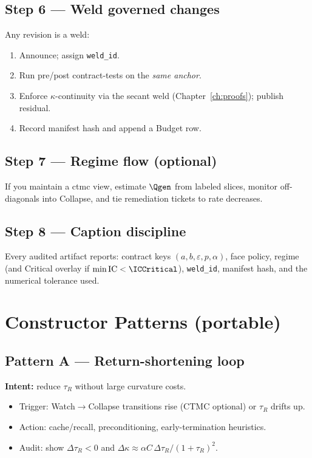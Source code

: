 \subsection*{Step 6 — Weld governed changes}
Any revision is a weld:
\begin{enumerate}[leftmargin=1.25em]
  \item Announce; assign \texttt{weld\_id}.
  \item Run pre/post contract-tests on the \emph{same anchor}.
  \item Enforce \(\kappa\)-continuity via the secant weld (Chapter~\ref{ch:proofs}); publish residual.
  \item Record manifest hash and append a Budget row.
\end{enumerate}

\subsection*{Step 7 — Regime flow (optional)}
If you maintain a \gls{ctmc} view, estimate \(\Qgen\) from labeled slices, monitor off-diagonals into Collapse, and tie remediation tickets to rate decreases.

\subsection*{Step 8 — Caption discipline}
Every audited artifact reports: contract keys \((a,b,\varepsilon,p,\alpha)\), face policy, regime (and Critical overlay if \(\min\mathrm{IC}<\ICCritical\)), \texttt{weld\_id}, manifest hash, and the numerical tolerance used.

\section{Constructor Patterns (portable)}

\subsection*{Pattern A — Return-shortening loop}
\textbf{Intent:} reduce \(\tau_{R}\) without large curvature costs.
\begin{itemize}[leftmargin=1.25em]
  \item Trigger: Watch\(\to\)Collapse transitions rise (CTMC optional) or \(\tau_{R}\) drifts up.
  \item Action: cache/recall, preconditioning, early-termination heuristics.
  \item Audit: show \(\Delta\tau_{R}<0\) and \(\Delta\kappa\approx \alpha C\,\Delta\tau_{R}/(1+\tau_{R})^2\).
\end{itemize}

